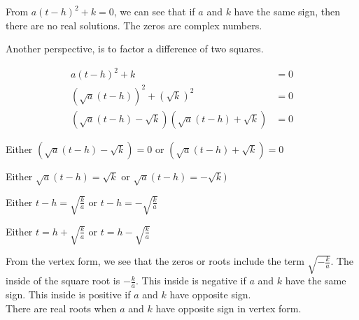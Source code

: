 \documentclass{ximera}
\begin{document}
\begin{itemize}
From $a (t - h)^2 + k  = 0$, we can see that if $a$ and $k$ have the same sign, then there are no real solutions.  The zeros are complex numbers.




Another perspective, is to factor a difference of two squares.




\begin{align*}
a (t - h)^2 + k    & = 0  \\
(\sqrt{a} (t - h))^2 + (\sqrt{k})^2       & = 0 \\
(\sqrt{a} (t - h) - \sqrt{k}) (\sqrt{a} (t - h) + \sqrt{k})         & = 0  
\end{align*}

Either $(\sqrt{a} (t - h) - \sqrt{k}) = 0$  or  $(\sqrt{a} (t - h) + \sqrt{k}) = 0$

Either $\sqrt{a} (t - h) = \sqrt{k}$  or  $\sqrt{a} (t - h) = -\sqrt{k})$


Either $t - h = \sqrt{\frac{k}{a}}$  or  $t - h = -\sqrt{\frac{k}{a}}$ 


Either $t  = h + \sqrt{\frac{k}{a}}$  or  $t = h - \sqrt{\frac{k}{a}}$ 






\end{itemize}



\begin{observation}



From the vertex form, we see that the zeros or roots include the term $\sqrt{-\frac{k}{a}}$.  The inside of the square root is $-\frac{k}{a}$.  This inside is negative if $a$ and $k$ have the same sign. This inside is positive if $a$ and $k$ have opposite sign. \\

There are real roots when $a$ and $k$ have opposite sign in vertex form. \\



\end{observation}
\end{document}
